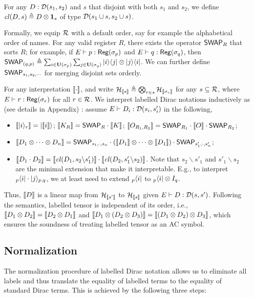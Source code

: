 \begin{definition}
  For any $D : {\mathcal{D}}(s_1,s_2)$ and $s$ that disjoint with both $s_1$ and $s_2$, we define ${\mathit{cl}}(D,s) \triangleq D\otimes \mathbf{1}_{s}$ of type ${\mathcal{D}}(s_1\cup s, s_2\cup s)$.
\end{definition}
Formally, we equip $\mathcal{R}$ with a default order, say for example the alphabetical order of names. For any valid register $R$, there exists the operator ${\mathsf{SWAP}}_R$ that sorts $R$; for example, if $E\vdash p : \mathsf{Reg}(\sigma_p)$ and $E\vdash q : \mathsf{Reg}(\sigma_q)$, then ${\mathsf{SWAP}}_{(q,p)} \triangleq \sum_{i\in \mathbf{U}(\sigma_p)}\sum_{j\in \mathbf{U}(\sigma_q)}|i\rangle\langle j|\otimes |j\rangle\langle i|$. We can further define ${\mathsf{SWAP}}_{s_1,s_2,\cdots}$ for merging disjoint sets orderly.

For any interpretation ${\llbracket \cdot \rrbracket}$, and write ${\mathcal{H}}_{{\llbracket s \rrbracket}} \triangleq \bigotimes_{r\in s}{\mathcal{H}}_{{\llbracket \sigma_r \rrbracket}}$ for any $s\subseteq \mathcal{R}$, where $E\vdash r : \mathsf{Reg}(\sigma_r)$ for all $r\in\mathcal{R}$. We interpret labelled Dirac notations inductively as (see details in Appendix) : assume $E\vdash D_i : {\mathcal{D}}(s_i,s'_i)$ in the following,
\begin{itemize}
  \item ${\llbracket |i\rangle_r \rrbracket} = |{\llbracket i \rrbracket}\rangle$; ${\llbracket K_R \rrbracket} = {\mathsf{SWAP}}_R \cdot {\llbracket K \rrbracket}$; ${\llbracket O_{R_1,R_2} \rrbracket} = {\mathsf{SWAP}}_{R_1}\cdot {\llbracket O \rrbracket}\cdot {\mathsf{SWAP}}_{R_2}$;
  \item ${\llbracket D_1\otimes \cdots \otimes D_n \rrbracket} = {\mathsf{SWAP}}_{s_1,\cdot,s_n}\cdot ({\llbracket D_1 \rrbracket}\otimes \cdots \otimes {\llbracket D_1 \rrbracket})\cdot {\mathsf{SWAP}}_{s'_1,\cdot,s'_n}$;
  \item ${\llbracket D_1\cdot D_2 \rrbracket} = {\llbracket {\mathit{cl}}(D_1, s_2\backslash s'_1) \rrbracket}\cdot {\llbracket {\mathit{cl}}(D_2, s'_1\backslash s_2) \rrbracket}$. Note that $s_2\backslash s'_1$ and $s'_1\backslash s_2$ are the minimal extension that make it interpretable. E.g., to interpret ${}_p\langle i|\cdot |j\rangle_{p,q}$, we at least need to extend ${}_p\langle i|$ to ${}_p\langle i|\otimes I_{q}$.
\end{itemize}
Thus, ${\llbracket D \rrbracket}$ is a linear map from ${\mathcal{H}}_{{\llbracket s' \rrbracket}}$ to ${\mathcal{H}}_{{\llbracket s \rrbracket}}$ given $E\vdash D : {\mathcal{D}}(s,s')$. Following the semantics, labelled tensor is independent of its order, i.e., ${\llbracket D_1\otimes D_2 \rrbracket} = {\llbracket D_2\otimes D_1 \rrbracket}$ and ${\llbracket D_1\otimes (D_2\otimes D_3) \rrbracket} = {\llbracket (D_1\otimes D_2)\otimes D_3 \rrbracket}$, which ensures the soundness of treating labelled tensor as an AC symbol.

\subsection{Normalization}
The normalization procedure of labelled Dirac notation allows us to eliminate all labels and thus translate the equality of labelled terms to the equality of standard Dirac terms. This is achieved by the following three steps: 

